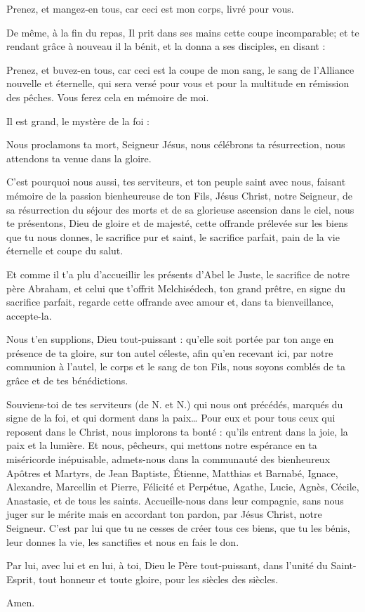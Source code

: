 \begin{paracol}{2}
\LigneParacol
{}
{Prenez, et mangez-en tous, car ceci est mon corps, livré pour vous.}

\LigneParacol
{}
{De même, à la fin du repas, Il prit dans ses mains cette coupe incomparable; et te rendant grâce à nouveau il la bénit, et la donna a ses disciples, en disant :}

\LigneParacol
{}
{Prenez, et buvez-en tous, car ceci est la coupe de mon sang, le sang de l'Alliance nouvelle et éternelle, qui sera versé pour vous et pour la multitude en rémission des pêches. Vous ferez cela en mémoire de moi.}

\LigneParacol
{}
{Il est grand, le mystère de la foi :}

\LigneParacol
{}
{Nous proclamons ta mort, Seigneur Jésus, nous célébrons ta résurrection, nous attendons ta venue dans la gloire.}

\LigneParacol
{}
{C'est pourquoi nous aussi, tes serviteurs, et ton peuple saint avec nous, faisant mémoire de la passion bienheureuse de ton Fils, Jésus Christ, notre Seigneur, de sa résurrection du séjour des morts et de sa glorieuse ascension dans le ciel, nous te présentons, Dieu de gloire et de majesté, cette offrande prélevée sur les biens que tu nous donnes, le sacrifice pur et saint, le sacrifice parfait, pain de la vie éternelle et coupe du salut.}

\LigneParacol
{}
{Et comme il t'a plu d'accueillir les présents d'Abel le Juste, le sacrifice de notre père Abraham, et celui que t'offrit Melchisédech, ton grand prêtre, en signe du sacrifice parfait, regarde cette offrande avec amour et, dans ta bienveillance, accepte-la.}

\LigneParacol
{}
{Nous t'en supplions, Dieu tout-puissant : qu'elle soit portée par ton ange en présence de ta gloire, sur ton autel céleste, afin qu'en recevant ici, par notre communion à l'autel, le corps et le sang de ton Fils, nous soyons comblés de ta grâce et de tes bénédictions.}

\LigneParacol
{}
{Souviens-toi de tes serviteurs (de N. et N.) qui nous ont précédés, marqués du signe de la foi, et qui dorment dans la paix… Pour eux et pour tous ceux qui reposent dans le Christ, nous implorons ta bonté : qu'ils entrent dans la joie, la paix et la lumière. Et nous, pêcheurs, qui mettons notre espérance en ta miséricorde inépuisable, admets-nous dans la communauté des bienheureux Apôtres et Martyrs, de Jean Baptiste, Étienne, Matthias et Barnabé, Ignace, Alexandre, Marcellin et Pierre, Félicité et Perpétue, Agathe, Lucie, Agnès, Cécile, Anastasie, et de tous les saints. Accueille-nous dans leur compagnie, sans nous juger sur le mérite mais en accordant ton pardon, par Jésus Christ, notre Seigneur. C'est par lui que tu ne cesses de créer tous ces biens, que tu les bénis, leur donnes la vie, les sanctifies et nous en fais le don.}

\LigneParacol
{}
{Par lui, avec lui et en lui, à toi, Dieu le Père tout-puissant, dans l'unité du Saint-Esprit, tout honneur et toute gloire, pour les siècles des siècles.}

\LigneParacol
{}
{Amen.}

\end{paracol}
